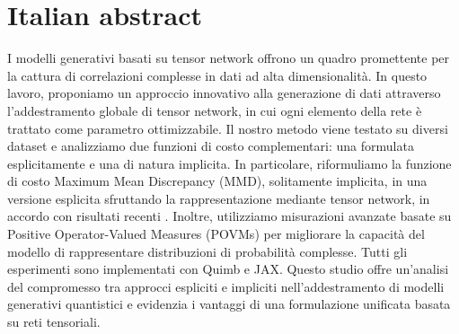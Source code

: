 \chapter*{Italian abstract}
I modelli generativi basati su tensor network offrono un quadro promettente per la cattura di correlazioni complesse in dati ad alta dimensionalità. In questo lavoro, proponiamo un approccio innovativo alla generazione di dati attraverso l’addestramento globale di tensor network, in cui ogni elemento della rete è trattato come parametro ottimizzabile. Il nostro metodo viene testato su diversi dataset e analizziamo due funzioni di costo complementari: una formulata esplicitamente e una di natura implicita. In particolare, riformuliamo la funzione di costo Maximum Mean Discrepancy (MMD), solitamente implicita, in una versione esplicita sfruttando la rappresentazione mediante tensor network, in accordo con risultati recenti \cite{rudolph_trainability_2024}. Inoltre, utilizziamo misurazioni avanzate basate su Positive Operator-Valued Measures (POVMs) per migliorare la capacità del modello di rappresentare distribuzioni di probabilità complesse. Tutti gli esperimenti sono implementati con Quimb e JAX. Questo studio offre un’analisi del compromesso tra approcci espliciti e impliciti nell’addestramento di modelli generativi quantistici e evidenzia i vantaggi di una formulazione unificata basata su reti tensoriali.
